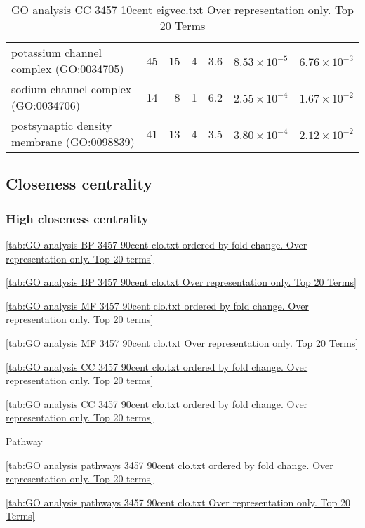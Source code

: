 \begin{table}[ht]
\begin{adjustbox}{width=\textwidth}
\begin{tabular}{lrrrrrr}
  potassium channel complex (GO:0034705) & 45 & 15 & 4 & 3.6 & $8.53 \times 10^{-5}$ & $6.76 \times 10^{-3}$ \\ 
  sodium channel complex (GO:0034706) & 14 & 8 & 1 & 6.2 & $2.55 \times 10^{-4}$ & $1.67 \times 10^{-2}$ \\ 
  postsynaptic density membrane (GO:0098839) & 41 & 13 & 4 & 3.5 & $3.80 \times 10^{-4}$ & $2.12 \times 10^{-2}$ \\ 
   \hline
\end{tabular}
\end{adjustbox}
\caption{GO analysis CC 3457 10cent eigvec.txt Over representation only. Top 20 Terms} 
\label{tab:GO analysis CC 3457 10cent eigvec.txt Over representation only. Top 20 Terms}
\end{table}

\clearpage
\subsection{Closeness centrality}

\subsubsection{High closeness centrality}

\ref{tab:GO analysis BP 3457 90cent clo.txt ordered by fold change. Over representation only. Top 20 terms}

\ref{tab:GO analysis BP 3457 90cent clo.txt Over representation only. Top 20 Terms}

\ref{tab:GO analysis MF 3457 90cent clo.txt ordered by fold change. Over representation only. Top 20 terms}

\ref{tab:GO analysis MF 3457 90cent clo.txt Over representation only. Top 20 Terms}

\ref{tab:GO analysis CC 3457 90cent clo.txt ordered by fold change. Over representation only. Top 20 terms}

\ref{tab:GO analysis CC 3457 90cent clo.txt ordered by fold change. Over representation only. Top 20 terms}

Pathway

\ref{tab:GO analysis pathways 3457 90cent clo.txt ordered by fold change. Over representation only. Top 20 terms}

\ref{tab:GO analysis pathways 3457 90cent clo.txt Over representation only. Top 20 Terms}

